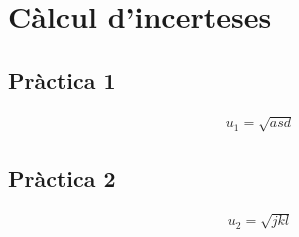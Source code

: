 \section{Càlcul d'incerteses}
\subsection*{Pràctica 1}
\begin{align}\label{inc:1}
	u_{1} = \sqrt{ asd }
\end{align}

\subsection*{Pràctica 2}
\begin{align}\label{inc:2}
	u_{2} = \sqrt{ jkl }
\end{align}
